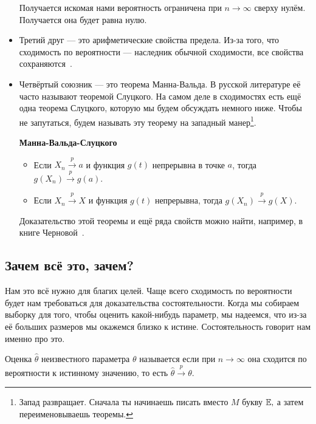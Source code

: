 \documentclass[12pt, a4paper, oneside]{article}
\begin{document}
\begin{itemize}
Получается искомая нами вероятность ограничена при $n \to \infty$ сверху нулём. Получается она будет равна нулю. 

\item Третий друг --- это арифметические свойства предела. Из-за того, что сходимость по вероятности --- наследник обычной сходимости, все свойства сохраняются~\cite{ref:chern}. 

\item Четвёртый союзник --- это теорема Манна-Вальда. В русской литературе её часто называют теоремой Слуцкого. На самом деле в сходимостях есть ещё одна теорема Слуцкого, которую мы будем обсуждать немного ниже. Чтобы не запутаться, будем называть эту теорему на западный манер\footnote{Запад развращает. Сначала ты начинаешь писать вместо $M$ букву $\mathbb{E},$ а затем переименовываешь теоремы.}. 

\begin{theorem}{\textbf{Манна-Вальда-Слуцкого}}

\begin{itemize} 
\item Если $X_n \overset{p}{\to} a$ и функция $g(t)$ непрерывна в точке $a$, тогда $g(X_n) \overset{p}{\to} g(a).$
\item Если $X_n \overset{p}{\to} X$ и функция $g(t)$ непрерывна, тогда $g(X_n) \overset{p}{\to} g(X).$
\end{itemize} 
\end{theorem}

Доказательство этой теоремы и ещё ряда свойств можно найти, например, в книге Черновой~\cite{ref:chern}.
\end{itemize} 

\subsection{Зачем всё это, зачем?}

Нам это всё нужно для благих целей. Чаще всего сходимость по вероятности будет нам требоваться для доказательства состоятельности. Когда мы собираем выборку для того, чтобы оценить какой-нибудь параметр, мы надеемся, что из-за её больших размеров мы окажемся близко к истине. Состоятельность говорит нам именно про это. 

\begin{definition} 
Оценка $\hat \theta$ неизвестного параметра $\theta$ называется  если при $n \to \infty$ она сходится по вероятности к истинному значению, то есть $\hat \theta  \overset{p}{\to} \theta$. 
\end{definition}
\end{document}
